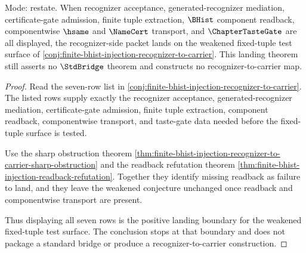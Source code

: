 \begin{theorem}
\label{thm:finite-bhist-injection-readback-closed-landing}
Mode: restate. When recognizer acceptance, generated-recognizer mediation, certificate-gate admission, finite tuple extraction, $\BHist$ component readback, componentwise $\hsame$ and $\NameCert$ transport, and $\ChapterTasteGate$ are all displayed, the recognizer-side packet lands on the weakened fixed-tuple test surface of \autoref{conj:finite-bhist-injection-recognizer-to-carrier}. This landing theorem still asserts no $\StdBridge$ theorem and constructs no recognizer-to-carrier map.
\end{theorem}
\begin{proof}
Read the seven-row list in \autoref{conj:finite-bhist-injection-recognizer-to-carrier}. The listed rows supply exactly the recognizer acceptance, generated-recognizer mediation, certificate-gate admission, finite tuple extraction, component readback, componentwise transport, and taste-gate data needed before the fixed-tuple surface is tested.

Use the sharp obstruction theorem \autoref{thm:finite-bhist-injection-recognizer-to-carrier-sharp-obstruction} and the readback refutation theorem \autoref{thm:finite-bhist-injection-readback-refutation}. Together they identify missing readback as failure to land, and they leave the weakened conjecture unchanged once readback and componentwise transport are present.

Thus displaying all seven rows is the positive landing boundary for the weakened fixed-tuple test surface. The conclusion stops at that boundary and does not package a standard bridge or produce a recognizer-to-carrier construction.
\end{proof}

